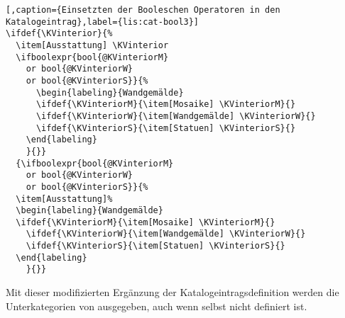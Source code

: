 \begin{lstlisting}[,caption={Einsetzten der Booleschen Operatoren in den Katalogeintrag},label={lis:cat-bool3}]
\ifdef{\KVinterior}{%
  \item[Ausstattung] \KVinterior 
  \ifboolexpr{bool{@KVinteriorM} 
    or bool{@KVinteriorW} 
    or bool{@KVinteriorS}}{%
      \begin{labeling}{Wandgemälde}
      \ifdef{\KVinteriorM}{\item[Mosaike] \KVinteriorM}{}
      \ifdef{\KVinteriorW}{\item[Wandgemälde] \KVinteriorW}{}
      \ifdef{\KVinteriorS}{\item[Statuen] \KVinteriorS}{}
    \end{labeling}
    }{}}
  {\ifboolexpr{bool{@KVinteriorM} 
    or bool{@KVinteriorW} 
    or bool{@KVinteriorS}}{%
  \item[Ausstattung]%
  \begin{labeling}{Wandgemälde}	
  \ifdef{\KVinteriorM}{\item[Mosaike] \KVinteriorM}{}
    \ifdef{\KVinteriorW}{\item[Wandgemälde] \KVinteriorW}{}
    \ifdef{\KVinteriorS}{\item[Statuen] \KVinteriorS}{}
  \end{labeling}
	}{}}
\end{lstlisting}
Mit dieser modifizierten Ergänzung der Katalogeintragsdefinition werden die Unterkategorien von  ausgegeben, 
auch wenn  selbst nicht definiert ist.
